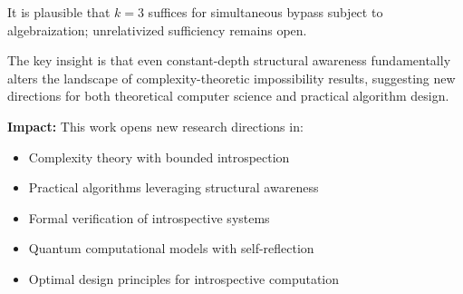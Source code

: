 \documentclass[11pt]{article}
\theoremstyle{plain}
\theoremstyle{definition}
\begin{document}
It is plausible that $k=3$ suffices for simultaneous bypass subject to algebraization; unrelativized sufficiency remains open.

The key insight is that even constant-depth structural awareness fundamentally alters the landscape of complexity-theoretic impossibility results, suggesting new directions for both theoretical computer science and practical algorithm design.

\textbf{Impact:} This work opens new research directions in:
\begin{itemize}
\item Complexity theory with bounded introspection
\item Practical algorithms leveraging structural awareness
\item Formal verification of introspective systems
\item Quantum computational models with self-reflection
\item Optimal design principles for introspective computation
\end{itemize}
\end{document}

